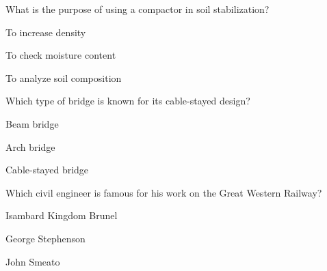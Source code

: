 \begin{enhancedmcq}{What is the purpose of using a compactor in soil stabilization?}
\item To increase density
\item To check moisture content
\item To analyze soil composition

\end{enhancedmcq}
\begin{enhancedmcq}{Which type of bridge is known for its cable-stayed design?}
\item Beam bridge
\item Arch bridge
\item Cable-stayed bridge

\end{enhancedmcq}
\begin{enhancedmcq}{Which civil engineer is famous for his work on the Great Western Railway?}
\item Isambard Kingdom Brunel
\item George Stephenson
\item John Smeato
\end{enhancedmcq}